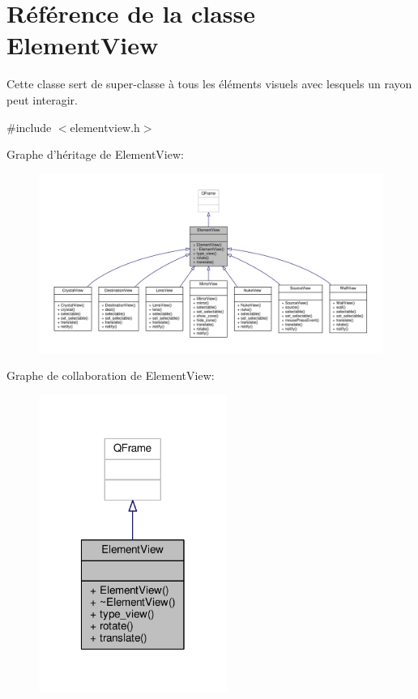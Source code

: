 \hypertarget{classElementView}{\section{Référence de la classe Element\+View}
\label{classElementView}
}


Cette classe sert de super-\/classe à tous les éléments visuels avec lesquels un rayon peut interagir.  




{\ttfamily \#include $<$elementview.\+h$>$}



Graphe d'héritage de Element\+View\+:\nopagebreak
\begin{figure}[H]
\begin{center}
\leavevmode
\includegraphics[width=350pt]{d8/d16/classElementView__inherit__graph}
\end{center}
\end{figure}


Graphe de collaboration de Element\+View\+:\nopagebreak
\begin{figure}[H]
\begin{center}
\leavevmode
\includegraphics[width=174pt]{d3/d60/classElementView__coll__graph}
\end{center}
\end{figure}
